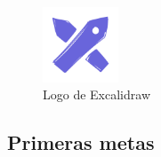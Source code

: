\documentclass[a4paper]{article}
\begin{document}
\begin{enumerate}
          \begin{figure}[h]
            \centering
            \includegraphics[width=0.2\textwidth]{Images/logoExcalidraw.png} %
            \caption{Logo de Excalidraw}
            \label{fig:excalidraw}
        \end{figure}
\end{enumerate}
\clearpage
\subsection{Primeras metas}
\end{document}
